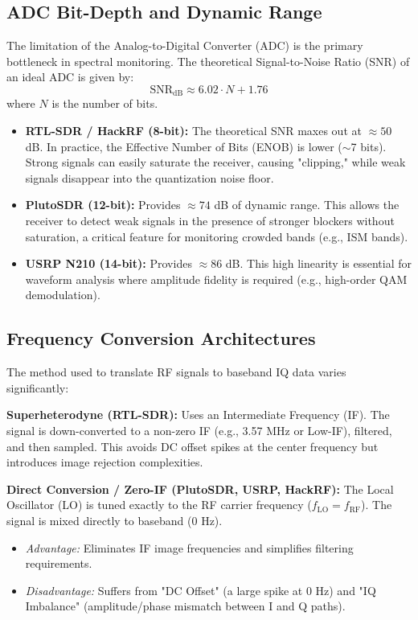 \documentclass[11pt]{article}
\begin{document}
\subsection{ADC Bit-Depth and Dynamic Range}
The limitation of the Analog-to-Digital Converter (ADC) is the primary bottleneck in spectral monitoring. The theoretical Signal-to-Noise Ratio (SNR) of an ideal ADC is given by:
\begin{equation}
    \text{SNR}_{\text{dB}} \approx 6.02 \cdot N + 1.76
\end{equation}
where $N$ is the number of bits.

\begin{itemize}
    \item \textbf{RTL-SDR / HackRF (8-bit):} The theoretical SNR maxes out at $\approx 50$ dB. In practice, the Effective Number of Bits (ENOB) is lower ($\sim$7 bits). Strong signals can easily saturate the receiver, causing "clipping," while weak signals disappear into the quantization noise floor.
    \item \textbf{PlutoSDR (12-bit):} Provides $\approx 74$ dB of dynamic range. This allows the receiver to detect weak signals in the presence of stronger blockers without saturation, a critical feature for monitoring crowded bands (e.g., ISM bands).
    \item \textbf{USRP N210 (14-bit):} Provides $\approx 86$ dB. This high linearity is essential for waveform analysis where amplitude fidelity is required (e.g., high-order QAM demodulation).
\end{itemize}

\subsection{Frequency Conversion Architectures}
The method used to translate RF signals to baseband IQ data varies significantly:

\textbf{Superheterodyne (RTL-SDR):} Uses an Intermediate Frequency (IF). The signal is down-converted to a non-zero IF (e.g., 3.57 MHz or Low-IF), filtered, and then sampled. This avoids DC offset spikes at the center frequency but introduces image rejection complexities.

\textbf{Direct Conversion / Zero-IF (PlutoSDR, USRP, HackRF):} The Local Oscillator (LO) is tuned exactly to the RF carrier frequency ($f_{\text{LO}} = f_{\text{RF}}$). The signal is mixed directly to baseband (0 Hz).

\begin{itemize}
    \item \emph{Advantage:} Eliminates IF image frequencies and simplifies filtering requirements.
    \item \emph{Disadvantage:} Suffers from "DC Offset" (a large spike at 0 Hz) and "IQ Imbalance" (amplitude/phase mismatch between I and Q paths).
\end{itemize}
\end{document}

